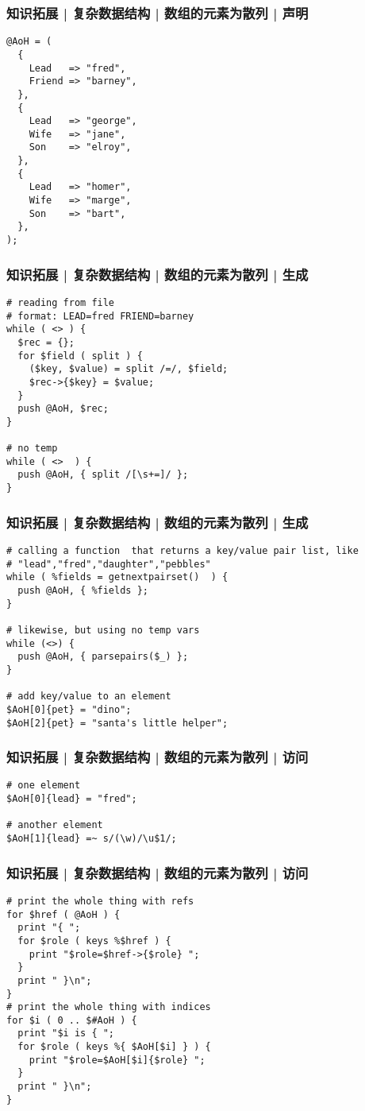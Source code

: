 \begin{frame}[fragile]
  \frametitle{知识拓展 | 复杂数据结构 | 数组的元素为散列 | 声明}
  \vspace{-0.8em}
\begin{lstlisting}
@AoH = (
  {
    Lead   => "fred",
    Friend => "barney",
  },
  {
    Lead   => "george",
    Wife   => "jane",
    Son    => "elroy",
  },
  {
    Lead   => "homer",
    Wife   => "marge",
    Son    => "bart",
  },
);
\end{lstlisting}
\end{frame}

\begin{frame}[fragile]
  \frametitle{知识拓展 | 复杂数据结构 | 数组的元素为散列 | 生成}
\begin{lstlisting}
# reading from file
# format: LEAD=fred FRIEND=barney
while ( <> ) {
  $rec = {};
  for $field ( split ) {
    ($key, $value) = split /=/, $field;
    $rec->{$key} = $value;
  }
  push @AoH, $rec;
}

# no temp
while ( <>  ) {
  push @AoH, { split /[\s+=]/ };
}
\end{lstlisting}
\end{frame}

\begin{frame}[fragile]
  \frametitle{知识拓展 | 复杂数据结构 | 数组的元素为散列 | 生成}
\begin{lstlisting}
# calling a function  that returns a key/value pair list, like
# "lead","fred","daughter","pebbles"
while ( %fields = getnextpairset()  ) {
  push @AoH, { %fields };
}

# likewise, but using no temp vars
while (<>) {
  push @AoH, { parsepairs($_) };
}

# add key/value to an element
$AoH[0]{pet} = "dino";
$AoH[2]{pet} = "santa's little helper";
\end{lstlisting}
\end{frame}

\begin{frame}[fragile]
  \frametitle{知识拓展 | 复杂数据结构 | 数组的元素为散列 | 访问}
\begin{lstlisting}
# one element
$AoH[0]{lead} = "fred";

# another element
$AoH[1]{lead} =~ s/(\w)/\u$1/;
\end{lstlisting}
\end{frame}

\begin{frame}[fragile]
  \frametitle{知识拓展 | 复杂数据结构 | 数组的元素为散列 | 访问}
  \vspace{-0.8em}
\begin{lstlisting}
# print the whole thing with refs
for $href ( @AoH ) {
  print "{ ";
  for $role ( keys %$href ) {
    print "$role=$href->{$role} ";
  }
  print " }\n";
}
# print the whole thing with indices
for $i ( 0 .. $#AoH ) {
  print "$i is { ";
  for $role ( keys %{ $AoH[$i] } ) {
    print "$role=$AoH[$i]{$role} ";
  }
  print " }\n";
}
\end{lstlisting}
\end{frame}

